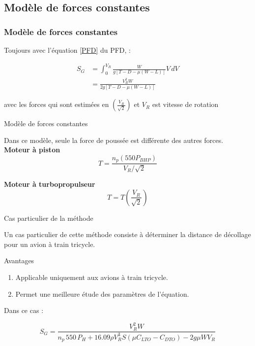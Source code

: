 \subsection{Modèle de forces constantes}


	
	\begin{frame}
		
		\frametitle{Modèle de forces constantes}
		
		Toujours avec l'équation \ref{PFD} du PFD, :
		
		\begin{align*}
			S_G &= \int_{0} ^ {V_R} \frac{W }{ g[T-D-\mu(W-L)]} V \, dV\\
				&= \frac{V_R^2 W} {2g[T-D-\mu(W-L)]}
		\end{align*}
		
		avec les forces qui sont estimées en $ \left(\frac{V_R}{\sqrt{2}}\right) $  et $ V_{R} $ est vitesse de rotation
		
	\end{frame}
	
	
	\begin{frame}{Modèle de forces constantes}
		
		Dans ce modèle, seule la force de poussée est différente des autres forces. \\
		
		\textbf{Moteur à piston}
		\[
		T=\frac{n_p(550P_{BHP})}{V_R/\sqrt{2}}
		\]
		
		\textbf{Moteur à turbopropulseur}
		\[
		T=T\left(\frac{V_R}{\sqrt{2}}\right)
		\]
		
	\end{frame}
	
	
	\begin{frame}{Cas particulier de la méthode}
		
		Un cas particulier de cette méthode consiste à déterminer la distance de décollage pour un avion à train tricycle.
		
		\begin{block}{Avantages}
			\begin{enumerate}
				\item Applicable uniquement aux avions à train tricycle.
				\item Permet une meilleure étude des paramètres de l'équation.
			\end{enumerate}
		\end{block}
		
		Dans ce cas :
		
		\begin{equation*}
			S_G=
			\frac{V_R^2 W}
			{n_p\,550\,P_H
				+16.09\rho V_R^3 S(\mu C_{LTO}-C_{DTO})
				-2g\mu W V_R}
		\end{equation*}
		
	\end{frame}
	
